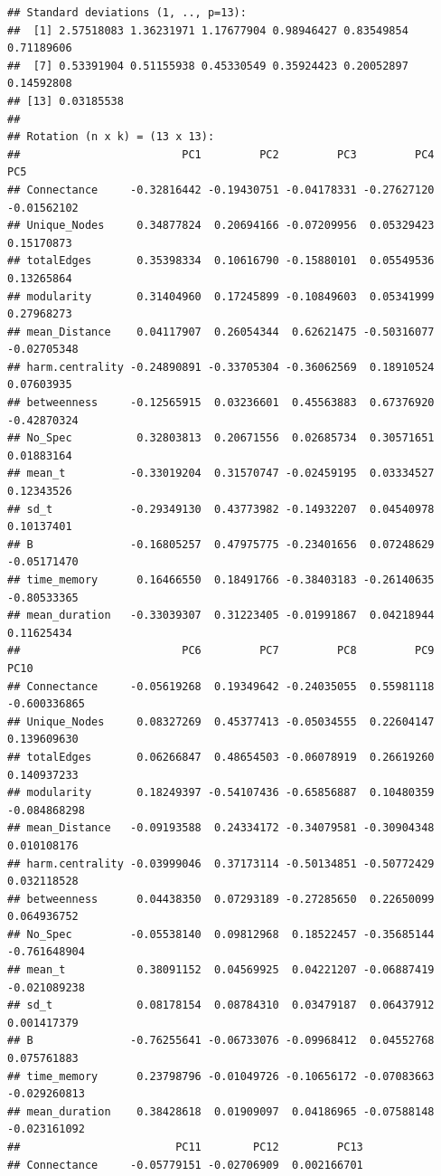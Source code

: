\documentclass[
]{article}
\begin{document}
\begin{verbatim}
## Standard deviations (1, .., p=13):
##  [1] 2.57518083 1.36231971 1.17677904 0.98946427 0.83549854 0.71189606
##  [7] 0.53391904 0.51155938 0.45330549 0.35924423 0.20052897 0.14592808
## [13] 0.03185538
## 
## Rotation (n x k) = (13 x 13):
##                         PC1         PC2         PC3         PC4         PC5
## Connectance     -0.32816442 -0.19430751 -0.04178331 -0.27627120 -0.01562102
## Unique_Nodes     0.34877824  0.20694166 -0.07209956  0.05329423  0.15170873
## totalEdges       0.35398334  0.10616790 -0.15880101  0.05549536  0.13265864
## modularity       0.31404960  0.17245899 -0.10849603  0.05341999  0.27968273
## mean_Distance    0.04117907  0.26054344  0.62621475 -0.50316077 -0.02705348
## harm.centrality -0.24890891 -0.33705304 -0.36062569  0.18910524  0.07603935
## betweenness     -0.12565915  0.03236601  0.45563883  0.67376920 -0.42870324
## No_Spec          0.32803813  0.20671556  0.02685734  0.30571651  0.01883164
## mean_t          -0.33019204  0.31570747 -0.02459195  0.03334527  0.12343526
## sd_t            -0.29349130  0.43773982 -0.14932207  0.04540978  0.10137401
## B               -0.16805257  0.47975775 -0.23401656  0.07248629 -0.05171470
## time_memory      0.16466550  0.18491766 -0.38403183 -0.26140635 -0.80533365
## mean_duration   -0.33039307  0.31223405 -0.01991867  0.04218944  0.11625434
##                         PC6         PC7         PC8         PC9         PC10
## Connectance     -0.05619268  0.19349642 -0.24035055  0.55981118 -0.600336865
## Unique_Nodes     0.08327269  0.45377413 -0.05034555  0.22604147  0.139609630
## totalEdges       0.06266847  0.48654503 -0.06078919  0.26619260  0.140937233
## modularity       0.18249397 -0.54107436 -0.65856887  0.10480359 -0.084868298
## mean_Distance   -0.09193588  0.24334172 -0.34079581 -0.30904348  0.010108176
## harm.centrality -0.03999046  0.37173114 -0.50134851 -0.50772429  0.032118528
## betweenness      0.04438350  0.07293189 -0.27285650  0.22650099  0.064936752
## No_Spec         -0.05538140  0.09812968  0.18522457 -0.35685144 -0.761648904
## mean_t           0.38091152  0.04569925  0.04221207 -0.06887419 -0.021089238
## sd_t             0.08178154  0.08784310  0.03479187  0.06437912  0.001417379
## B               -0.76255641 -0.06733076 -0.09968412  0.04552768  0.075761883
## time_memory      0.23798796 -0.01049726 -0.10656172 -0.07083663 -0.029260813
## mean_duration    0.38428618  0.01909097  0.04186965 -0.07588148 -0.023161092
##                        PC11        PC12         PC13
## Connectance     -0.05779151 -0.02706909  0.002166701

\end{verbatim}
\end{document}
